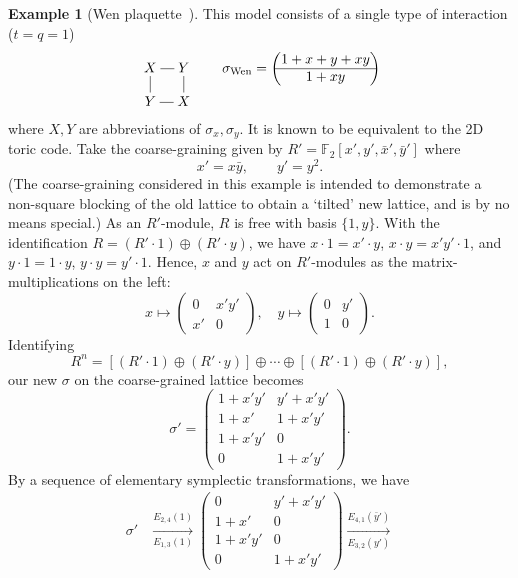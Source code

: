 \documentclass[letterpaper,12pt]{amsart}
\theoremstyle{definition} \newtheorem{defn}{Definition}
\theoremstyle{definition} \newtheorem{rem}{Remark}
\theoremstyle{definition} \newtheorem{example}{Example}
\newcommand{\FF}{\mathbb{F}}
\begin{document}
\begin{example}[Wen plaquette~\cite{Wen2003Plaquette}]
This model consists of a single type of interaction ($t=q=1$)
\[
\xymatrix@!0{
X \ar@{-}[r] & Y \ar@{-}[d] \\
Y \ar@{-}[u] & X \ar@{-}[l]
} \quad \quad
\sigma_\text{Wen} = 
\begin{pmatrix}
 1 + x + y + xy \\
\hline
 1 + xy
\end{pmatrix}
\]
where $X,Y$ are abbreviations of $\sigma_x,\sigma_y$.
It is known to be equivalent to the 2D toric code.
Take the coarse-graining given by $R' = \FF_2[x',y',\bar x', \bar y']$ where
\[
 x' = x \bar y, \quad \quad y' = y^2 .
\]
(The coarse-graining considered in this example
is intended to demonstrate a non-square blocking of the old lattice
to obtain a `tilted' new lattice, and is by no means special.)
As an $R'$-module, $R$ is free with basis $\{ 1, y \}$.
With the identification $R = (R' \cdot 1) \oplus (R' \cdot y)$,
we have $x \cdot 1 = x' \cdot y$, $x \cdot y = x'y' \cdot 1$,
and $y \cdot 1 = 1 \cdot y$, $y \cdot y = y' \cdot 1$.
Hence, $x$ and $y$ act on $R'$-modules
as the matrix-multiplications on the left:
\[
x \mapsto 
\begin{pmatrix}
0  & x'y'\\
x' &   0
\end{pmatrix},
\quad
y \mapsto
\begin{pmatrix}
0 & y'\\
1 & 0
\end{pmatrix}.
\]
Identifying
\[
 R^n = [ (R' \cdot 1) \oplus (R' \cdot y) ] \oplus \cdots \oplus [(R' \cdot 1) \oplus (R' \cdot y)] ,
\]
our new $\sigma$ on the coarse-grained lattice becomes
\[
 \sigma' =
\begin{pmatrix}
1+x'y' & y'+x'y'\\
1+x'   & 1+x'y'\\
\hline
1+x'y' & 0 \\
0      & 1+x'y'
\end{pmatrix}.
\]
By a sequence of elementary symplectic transformations, we have
\begin{align*}
\sigma'
&
\xrightarrow[E_{1,3}(1)]{E_{2,4}(1)}
%
\begin{pmatrix}
0      & y'+x'y' \\
1+x'   & 0       \\
1+x'y' & 0       \\
0      & 1+x'y'
\end{pmatrix} 
%
\xrightarrow[E_{3,2}(y')]{E_{4,1}(\bar y')}

\end{align*}
\end{example}
\end{document}
